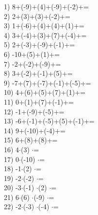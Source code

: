 \documentclass[a4paper,10pt]{article}
\begin{document}
1)   8+(-9)+(4)+(-9)+(-2)+=
\vspace{0.5cm}\\2)   2+(3)+(3)+(-2)+=
\vspace{0.5cm}\\3)   1+(-6)+(4)+(4)+(1)+=
\vspace{0.5cm}\\4)   3+(-4)+(3)+(7)+(-4)+=
\vspace{0.5cm}\\5)   2+(-3)+(-9)+(-1)+=
\vspace{0.5cm}\\6)   -10+(5)+(1)+=
\vspace{0.5cm}\\7)   -2+(-2)+(-9)+=
\vspace{0.5cm}\\8)   3+(-2)+(-1)+(5)+=
\vspace{0.5cm}\\9)   -7+(7)+(-7)+(-1)+(-5)+=
\vspace{0.5cm}\\10)   4+(6)+(5)+(7)+(1)+=
\vspace{0.5cm}\\11)   0+(1)+(7)+(-1)+=
\vspace{0.5cm}\\12)   -1+(-9)+(-5)+=
\vspace{0.5cm}\\13)   -6+(-1)+(-5)+(5)+(-1)+=
\vspace{0.5cm}\\14)   9+(-10)+(-4)+=
\vspace{0.5cm}\\15)   6+(8)+(8)+=
\vspace{0.5cm}\\16)   4$\cdot$(3) $\cdot$=
\vspace{0.5cm}\\17)   0$\cdot$(-10) $\cdot$=
\vspace{0.5cm}\\18)   -1$\cdot$(2) $\cdot$=
\vspace{0.5cm}\\19)   -2$\cdot$(-2) $\cdot$=
\vspace{0.5cm}\\20)   -3$\cdot$(-1) $\cdot$(2) $\cdot$=
\vspace{0.5cm}\\21)   6$\cdot$(6) $\cdot$(-9) $\cdot$=
\vspace{0.5cm}\\22)   -2$\cdot$(-3) $\cdot$(-4) $\cdot$=
\end{document}
